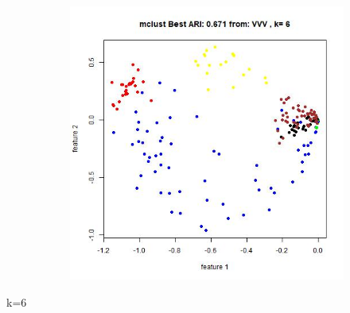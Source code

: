 \documentclass{article}
\begin{document}
\begin{figure}[h!]
\begin{subfigure}[b]{0.3\linewidth}
\end{subfigure} 
\begin{subfigure}[b]{0.3\linewidth}
  \includegraphics[width=\linewidth]{r_ari_k6.jpg}
\end{subfigure}
\end{figure}

k=6
\newpage
\end{document}
